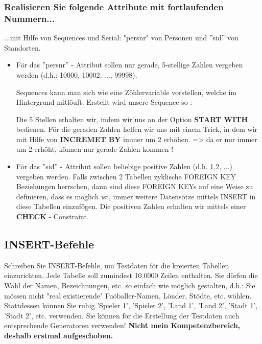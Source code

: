 \subsubsection{Realisieren Sie folgende Attribute mit fortlaufenden Nummern...}
...mit Hilfe von Sequences und Serial: "persnr" von Personen und ''sid'' von Standorten.
\begin{itemize}
\item För das ''persnr'' - Attribut sollen nur gerade, 5-stellige Zahlen vergeben werden (d.h.: 10000, 10002, ..., 99998).\newline

Sequences kann man sich wie eine Zöhlervariable vorstellen, welche im Hintergrund mitlöuft.
Erstellt wird unsere Sequence so :


Die 5 Stellen erhalten wir, indem wir uns an der Option \textbf{START WITH} bedienen.\newline
För die geraden Zahlen helfen wir uns mit einem Trick, in dem wir mit Hilfe von \textbf{INCREMET BY} immer um 2 erhöhen.\newline
=> da er nur immer um 2 erhöht, können nur gerade Zahlen kommen ! \newline

\item För das ''sid'' - Attribut sollen beliebige positive Zahlen (d.h. 1,2, ...) vergeben werden.\newline
Falls zwischen 2 Tabellen zyklische FOREIGN KEY Beziehungen herrschen,
dann sind diese FOREIGN KEYs auf eine Weise zu definieren, dass es möglich ist, immer weitere Datensötze mittels INSERT in diese Tabellen einzufögen.\newline
Die positiven Zahlen erhalten wir mittels einer \textbf{CHECK} - Constraint.\newline


\end{itemize}

\subsection{INSERT-Befehle}
Schreiben Sie INSERT-Befehle, um Testdaten för die kreierten Tabellen einzurichten. \newline
Jede Tabelle soll zumindest 10.0000 Zeilen enthalten. \newline
Sie dörfen die Wahl der Namen, Bezeichnungen, etc. so einfach wie möglich gestalten, d.h.: Sie mössen nicht "real existierende" Fuöballer-Namen, Lönder, Stödte, etc. wöhlen. \newline
Stattdessen können Sie ruhig 'Spieler 1', 'Spieler 2', 'Land 1', 'Land 2', 'Stadt 1', 'Stadt 2', etc. verwenden. \newline
Sie können för die Erstellung der Testdaten auch entsprechende Generatoren verwenden! \newline
\textbf{Nicht mein Kompetenzbereich, deshalb erstmal aufgeschoben.}


